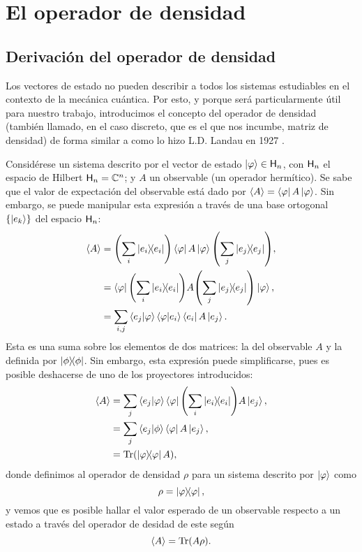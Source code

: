 \section{El operador de densidad}
\subsection{Derivación del operador de densidad}

Los vectores de estado no pueden describir a todos los sistemas estudiables en el contexto de la mecánica cuántica. Por esto, y porque será particularmente útil para nuestro trabajo, introducimos el concepto del operador de densidad (también llamado, en el caso discreto, que es el que nos incumbe, matriz de densidad) de forma similar a como lo hizo L.D. Landau en 1927 \cite{Landau}.

Considérese un sistema descrito por el vector de estado $\ket{\varphi}\in{\sf H}_{n}$, con ${\sf H}_{n}$ el espacio de Hilbert ${\sf H}_{n}=\mathbb{C}^{n}$; y $A$ un observable (un operador hermítico). Se sabe que el valor de expectación del observable está dado por $\expval{A}=\bra{\varphi}A\ket{\varphi}$. Sin embargo, se puede manipular esta expresión a través de una base ortogonal $\{\ket{e_{k}}\}$ del espacio ${\sf H}_{n}$:
\begin{align*}
\expval{A}&=\qty(\sum_{i}\dyad{e_{i}})\bra{\varphi}A\ket{\varphi}\qty(\sum_{j}\dyad{e_{j}}),\\
&=\bra{\varphi}\qty(\sum_{i}\dyad{e_{i}})A\qty(\sum_{j}\dyad{e_{j}})\ket{\varphi},\\
&=\sum_{i,j}\bra{e_{j}}\ket{\varphi}\bra{\varphi}\ket{e_{i}}\bra{e_{i}}A\ket{e_{j}}.\\
\end{align*}
Esta es una suma sobre los elementos de dos matrices: la del observable $A$ y la definida por $\dyad{\phi}$. 
Sin embargo, esta expresión puede simplificarse, pues es posible deshacerse de uno de los proyectores introducidos:
\begin{align*}
\expval{A}&=\sum_{j}\bra{e_{j}}\ket{\varphi}\bra{\varphi}\qty(\sum_{i}\dyad{e_{i}})A\ket{e_{j}},\\
&=\sum_{j}\bra{e_{j}}\ket{\phi}\bra{\varphi}A\ket{e_{j}},\\
&=\Tr(\dyad{\varphi}A),\\
\end{align*}
donde definimos al operador de densidad $\rho$ para un sistema descrito por $\ket{\varphi}$ como
\begin{equation}\label{eq:DensOpPure}
\rho=\dyad{\varphi},
\end{equation} 
y vemos que es posible hallar el valor esperado de un observable respecto a un estado a través del operador 
de desidad de este según
\begin{equation}\label{eq:ExpValFromDensOp}
\expval{A}=\Tr(A\rho).
\end{equation}

